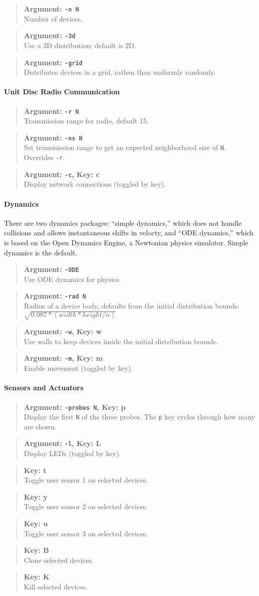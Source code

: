 \documentclass{article}
\newcommand\var[1]{{\tt #1}}
\newcommand\key[1]{{\bf #1}}
\newcommand\simarg[2]{\begin{quote} {\bf Argument: \var{#1}} \\ #2 \end{quote}}
\newcommand\simkey[2]{\begin{quote} {\bf Key: \key{#1}} \\ #2 \end{quote}}
\newcommand\simargkey[3]{
  \begin{quote} {\bf Argument: \var{#1}, Key: \key{#2}} \\ #3 \end{quote}
}
\begin{document}
\simarg{-n N}{Number of devices.}
\simarg{-3d}{Use a 3D distribution; default is 2D.}
\simarg{-grid}{Distributes devices in a grid, rathen than uniformly
  randomly.}

\paragraph{Unit Disc Radio Communication}
\simarg{-r N}{Transmission range for radio, default 15.}
\simarg{-ns N}{Set transmission range to get an expected neighborhood
  size of \var{N}.  Overrides \var{-r}.}
\simargkey{-c}{c}{Display network connections (toggled by key).}

\paragraph{Dynamics}
There are two dynamics packages: ``simple dynamics,'' which does
not handle collisions and allows instantaneous shifts in velocty, 
and ``ODE dynamics,'' which is based on the Open Dynamics Engine,
a Newtonian physics simulator.  Simple dynamics is the default.

\simarg{-ODE}{Use ODE dynamics for physics.}
\simarg{-rad N}{Radius of a device body, defaults from the initial
  distribution bounds: $\sqrt{0.087*(width*height/n)}$}
\simargkey{-w}{w}{Use walls to keep devices inside the initial distribution
  bounds.}
\simargkey{-m}{m}{Enable movement (toggled by key).}

\paragraph{Sensors and Actuators}
\simargkey{-probes N}{p}{Display the first \var{N} of the three probes.  
  The \var{p} key cycles through how many are shown.}
\simargkey{-l}{L}{Display LEDs (toggled by key).}
\simkey{t}{Toggle user sensor 1 on selected devices.}
\simkey{y}{Toggle user sensor 2 on selected devices.}
\simkey{u}{Toggle user sensor 3 on selected devices.}
\simkey{B}{Clone selected devices.}
\simkey{K}{Kill selected devices.}
\end{document}
